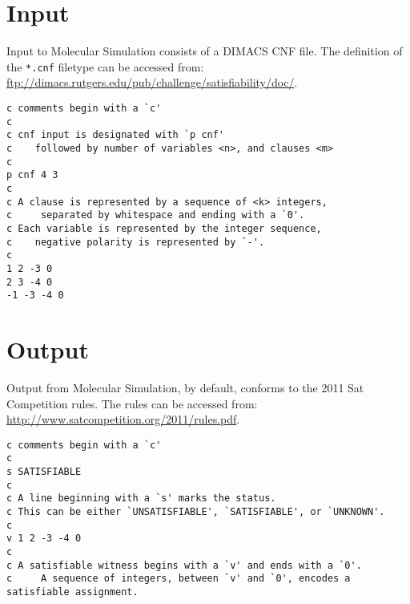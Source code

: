 	\section{Input}
	\label{inputSection}
	

Input to Molecular Simulation consists of a DIMACS CNF file. The definition of the \texttt{*.cnf} filetype can be accessed from: \url{ftp://dimacs.rutgers.edu/pub/challenge/satisfiability/doc/}.

\begin{verbatim}
c comments begin with a `c'
c
c cnf input is designated with `p cnf'
c    followed by number of variables <n>, and clauses <m>
c
p cnf 4 3
c
c A clause is represented by a sequence of <k> integers,
c     separated by whitespace and ending with a `0'.
c Each variable is represented by the integer sequence, 
c    negative polarity is represented by `-'.
c
1 2 -3 0
2 3 -4 0
-1 -3 -4 0
\end{verbatim}
		
	\section{Output}
	\label{outputSection}
	

Output from Molecular Simulation, by default, conforms to the 2011 {\sc Sat} Competition rules.  The rules can be accessed from: \url{http://www.satcompetition.org/2011/rules.pdf}.

\begin{verbatim}
c comments begin with a `c'
c
s SATISFIABLE
c
c A line beginning with a `s' marks the status.
c This can be either `UNSATISFIABLE', `SATISFIABLE', or `UNKNOWN'.
c
v 1 2 -3 -4 0
c
c A satisfiable witness begins with a `v' and ends with a `0'.
c     A sequence of integers, between `v' and `0', encodes a satisfiable assignment.
\end{verbatim}

\FloatBarrier

